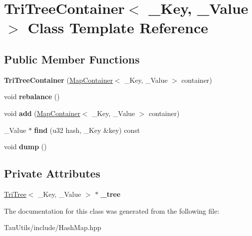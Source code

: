 \hypertarget{class_tri_tree_container}{}\section{Tri\+Tree\+Container$<$ \+\_\+\+Key, \+\_\+\+Value $>$ Class Template Reference}
\label{class_tri_tree_container}
\subsection*{Public Member Functions}
\begin{DoxyCompactItemize}
\item 
\mbox{\label{class_tri_tree_container_ae7536ea37dc8ac3986bd43c54f36b42a}} 
{\bfseries Tri\+Tree\+Container} (\mbox{\hyperlink{struct_map_container}{Map\+Container}}$<$ \+\_\+\+Key, \+\_\+\+Value $>$ container)
\item 
\mbox{\label{class_tri_tree_container_aff34653d04a7b4f86ea46a17a2a5afbe}} 
void {\bfseries rebalance} ()
\item 
\mbox{\label{class_tri_tree_container_a8859d39c6259869f2cdcb9b8f1e15b8a}} 
void {\bfseries add} (\mbox{\hyperlink{struct_map_container}{Map\+Container}}$<$ \+\_\+\+Key, \+\_\+\+Value $>$ container)
\item 
\mbox{\label{class_tri_tree_container_a219fe0fa7f6348dc1c8831659575c359}} 
\+\_\+\+Value $\ast$ {\bfseries find} (u32 hash, \+\_\+\+Key \&key) const
\item 
\mbox{\label{class_tri_tree_container_af00f61590666a2a83f36f1918ebc34cc}} 
void {\bfseries dump} ()
\end{DoxyCompactItemize}
\subsection*{Private Attributes}
\begin{DoxyCompactItemize}
\item 
\mbox{\label{class_tri_tree_container_ad4aff908778033defadbacc850b1d8ea}} 
\mbox{\hyperlink{class_tri_tree}{Tri\+Tree}}$<$ \+\_\+\+Key, \+\_\+\+Value $>$ $\ast$ {\bfseries \+\_\+tree}
\end{DoxyCompactItemize}


The documentation for this class was generated from the following file\+:\begin{DoxyCompactItemize}
\item 
Tau\+Utils/include/Hash\+Map.\+hpp\end{DoxyCompactItemize}
